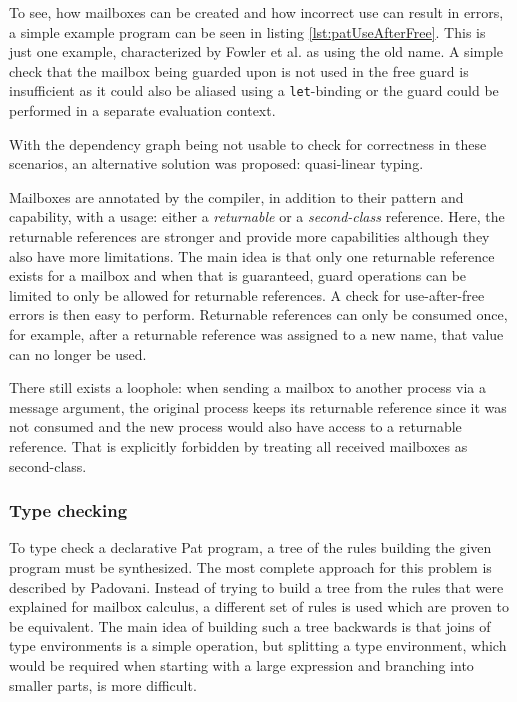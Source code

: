 To see, how mailboxes can be created and how incorrect use can result in errors, a simple example program can be seen in listing \ref{lst:patUseAfterFree}. This is just one example, characterized by Fowler et al. as using the old name. A simple check that the mailbox being guarded upon is not used in the free guard is insufficient as it could also be aliased using a \lstinline|let|-binding or the guard could be performed in a separate evaluation context.

With the dependency graph being not usable to check for correctness in these scenarios, an alternative solution was proposed: quasi-linear typing. 

Mailboxes are annotated by the compiler, in addition to their pattern and capability, with a usage: either a \textit{returnable} or a \textit{second-class} reference. Here, the returnable references are stronger and provide more capabilities although they also have more limitations. The main idea is that only one returnable reference exists for a mailbox and when that is guaranteed, guard operations can be limited to only be allowed for returnable references. A check for use-after-free errors is then easy to perform. Returnable references can only be consumed once, for example, after a returnable reference was assigned to a new name, that value can no longer be used.

There still exists a loophole: when sending a mailbox to another process via a message argument, the original process keeps its returnable reference since it was not consumed and the new process would also have access to a returnable reference. That is explicitly forbidden by treating all received mailboxes as second-class.

\subsubsection{Type checking}

To type check a declarative Pat program, a tree of the rules building the given program must be synthesized. The most complete approach for this problem is described by Padovani\cite{padovaniTypeCheckingAlgorithm2018}. Instead of trying to build a tree from the rules that were explained for mailbox calculus, a different set of rules is used which are proven to be equivalent. The main idea of building such a tree backwards is that joins of type environments is a simple operation, but splitting a type environment, which would be required when starting with a large expression and branching into smaller parts, is more difficult.

